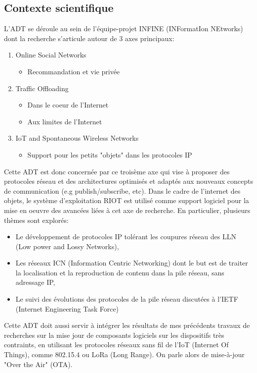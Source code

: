 \documentclass[a4paper, twoside]{article}
\begin{document}
\subsection{Contexte scientifique}

L'ADT se déroule au sein de l'équipe-projet INFINE (INFormatIon NEtworks) dont
la recherche s'articule autour de 3 axes principaux:

\begin{enumerate}
	\item Online Social Networks
	\begin{itemize}
		\item Recommandation et vie privée
	\end{itemize}
	\item Traffic Offloading
	\begin{itemize}
		\item Dans le coeur de l'Internet
		\item Aux limites de l'Internet
	\end{itemize}
	\item IoT and Spontaneous Wireless Networks
	\begin{itemize}
		\item Support pour les petits "objets" dans les protocoles IP
	\end{itemize}
\end{enumerate}

Cette ADT est donc concernée par ce troisème axe qui vise à proposer des
protocoles réseau et des architectures optimisés et adaptés aux nouveaux
concepts de communication (e.g publish/subscribe, etc). Dans le cadre de
l'internet des objets, le système d'exploitation RIOT est utilisé comme support
logiciel\cite{RIOT-infocom} pour la mise en oeuvre des avancées liées à cet axe de recherche.
En particulier, plusieurs thèmes sont explorés:
\begin{itemize}
    \item Le développement de protocoles IP tolérant les coupures réseau des LLN (Low
power and Lossy Networks),
    \item Les réseaux ICN (Information Centric Networking)\cite{ICN-RIOT} dont le but est de
traiter la localisation et la reproduction de contenu dans la pile réseau, sans
adressage IP,
    \item Le suivi des évolutions des protocoles de la pile réseau discutées à l'IETF
(Internet Engineering Task Force)
\end{itemize}

Cette ADT doit aussi servir à intégrer les résultats de mes précédents travaux
de recherches sur la mise jour de composants logiciels sur les dispositifs très
contraints\cite{models-at-runtime}, en utilisant les protocoles réseaux sans fil de l'IoT (Internet
Of Things), comme 802.15.4 ou LoRa (Long Range). On parle alors de mise-à-jour
"Over the Air" (OTA).
\end{document}
